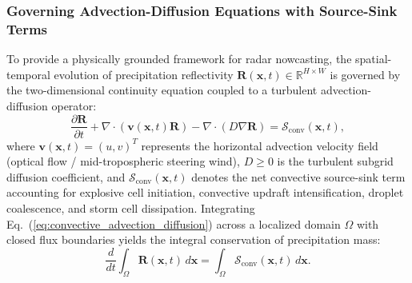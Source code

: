\subsubsection{Governing Advection-Diffusion Equations with Source-Sink Terms}
To provide a physically grounded framework for radar nowcasting, the spatial-temporal evolution of precipitation reflectivity $\mathbf{R}(\mathbf{x}, t) \in \mathbb{R}^{H \times W}$ is governed by the two-dimensional continuity equation coupled to a turbulent advection-diffusion operator:
\begin{equation}
    \frac{\partial \mathbf{R}}{\partial t} + \nabla \cdot \left(\mathbf{v}(\mathbf{x}, t) \mathbf{R}\right) - \nabla \cdot \left( D \nabla \mathbf{R} \right) = \mathcal{S}_{\text{conv}}(\mathbf{x}, t),
    \label{eq:convective_advection_diffusion}
\end{equation}
where $\mathbf{v}(\mathbf{x}, t) = (u, v)^T$ represents the horizontal advection velocity field (optical flow / mid-tropospheric steering wind), $D \ge 0$ is the turbulent subgrid diffusion coefficient, and $\mathcal{S}_{\text{conv}}(\mathbf{x}, t)$ denotes the net convective source-sink term accounting for explosive cell initiation, convective updraft intensification, droplet coalescence, and storm cell dissipation. Integrating Eq.~(\ref{eq:convective_advection_diffusion}) across a localized domain $\Omega$ with closed flux boundaries yields the integral conservation of precipitation mass:
\begin{equation}
    \frac{d}{dt} \int_\Omega \mathbf{R}(\mathbf{x}, t) \, d\mathbf{x} = \int_\Omega \mathcal{S}_{\text{conv}}(\mathbf{x}, t) \, d\mathbf{x}.
    \label{eq:radar_mass_balance}
\end{equation}

